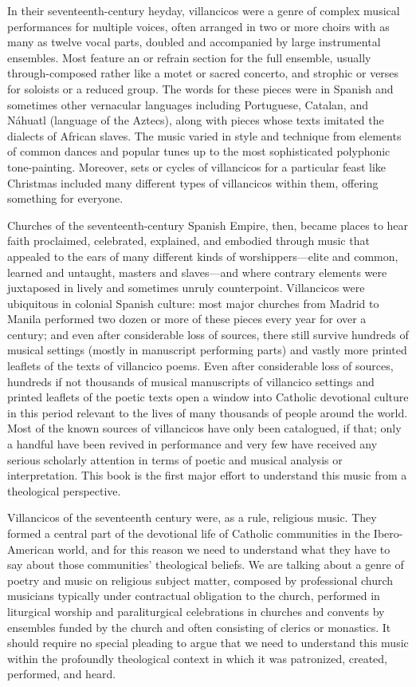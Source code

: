 In their seventeenth-century heyday, villancicos were a genre of complex musical
performances for multiple voices, often arranged in two or more choirs with as
many as twelve vocal parts, doubled and accompanied by large instrumental
ensembles.
Most feature an  or refrain section for the full ensemble,
usually through-composed rather like a motet or sacred concerto, and strophic
 or verses for soloists or a reduced group.
The words for these pieces were in Spanish and sometimes other vernacular
languages including Portuguese, Catalan, and Náhuatl (language of the Aztecs),
along with pieces whose texts imitated the dialects of African slaves.
The music varied in style and technique from elements of common dances
and popular tunes up to the most sophisticated polyphonic tone-painting.
Moreover, sets or cycles of villancicos for a particular feast like Christmas
included many different types of villancicos within them, offering something
for everyone.

Churches of the seventeenth-century Spanish Empire, then, became places to hear
faith proclaimed, celebrated, explained, and embodied through music that
appealed to the ears of many different kinds of worshippers---elite and common,
learned and untaught, masters and slaves---and where contrary elements were
juxtaposed in lively and sometimes unruly counterpoint.
Villancicos were ubiquitous in colonial Spanish culture: most major churches
from Madrid to Manila performed two dozen or more of these pieces every year
for over a century; and even after considerable loss of sources, there still
survive hundreds of musical settings (mostly in manuscript performing parts)
and vastly more printed leaflets of the texts of villancico poems.
Even after considerable loss of sources, hundreds if not thousands of musical
manuscripts of villancico settings and printed leaflets of the poetic texts
open a window into Catholic devotional culture in this period relevant to the
lives of many thousands of people around the world.
Most of the known sources of villancicos have only been catalogued, if that;
only a handful have been revived in performance and very few have received any
serious scholarly attention in terms of poetic and musical analysis or
interpretation.
This book is the first major effort to understand this music from a theological
perspective.

Villancicos of the seventeenth century were, as a rule, religious music.
They formed a central part of the devotional life of Catholic communities in
the Ibero-American world, and for this reason we need to understand what they
have to say about those communities' theological beliefs. 
We are talking about a genre of poetry and music on religious subject matter,
composed by professional church musicians typically under contractual
obligation to the church, performed in liturgical worship and paraliturgical
celebrations in churches and convents by ensembles funded by the church and
often consisting of clerics or monastics.
It should require no special pleading to argue that we need to understand this
music within the profoundly theological context in which it was patronized,
created, performed, and heard.

